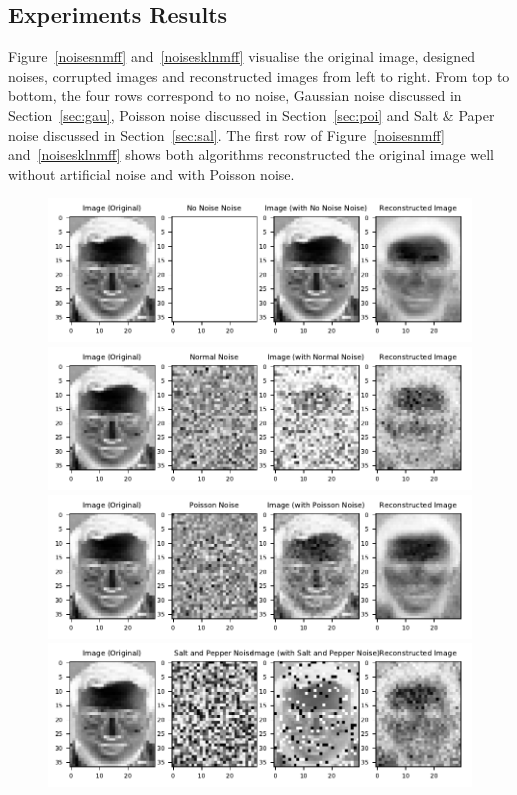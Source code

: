 \subsection{Experiments Results}
Figure~\ref{noisesnmff} and~\ref{noisesklnmff} visualise the original image, designed noises, corrupted images and reconstructed images from left to right. From top to bottom, the four rows correspond to no noise, Gaussian noise discussed in Section~\ref{sec:gau}, Poisson noise discussed in Section~\ref{sec:poi} and Salt \& Paper noise discussed in Section~\ref{sec:sal}.
The first row of Figure~\ref{noisesnmff} and~\ref{noisesklnmff} shows both algorithms reconstructed the original image well without artificial noise and with Poisson noise.
\begin{figure}
	\centering
	\includegraphics[scale=.9]{Result_Multiplication_Euclidean_No_Noise_Comparison}\\
	\includegraphics[scale=.9]{Result_Multiplication_Euclidean_Normal_Comparison}\\
	\includegraphics[scale=.9]{Result_Multiplication_Euclidean_Poisson_Comparison}\\
	\includegraphics[scale=.9]{Result_Multiplication_Euclidean_Salt_and_Pepper_Comparison}

\end{figure}
